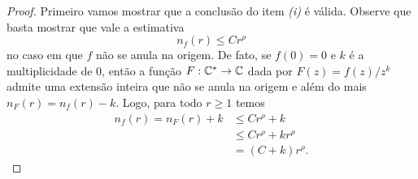     \begin{proof}
       Primeiro vamos mostrar que a conclusão do item {\it (i)} é válida. 
       Observe que basta mostrar que vale a estimativa
       \begin{equation*}
           n_f(r) \leq Cr^{\rho}
       \end{equation*}
       no caso em que $f$ não se anula na origem. 
       De fato, se $f(0) = 0$ e $k$
       é a multiplicidade de $0$, então a função $F:\mathbb{C}^*\to\mathbb{C}$ dada por 
       $F(z) = f(z)/z^k$ admite uma extensão inteira que não se anula na origem
       e além do mais $n_F(r) = n_f(r) - k$. Logo, para todo $r\geqslant 1$ temos
       \begin{align*}
           n_f(r) = n_F(r) + k &\leq Cr^{\rho} + k \\
                               &\leq Cr^{\rho} + kr^{\rho} \\
                               &= (C+k) r^{\rho}.
       \end{align*}


\end{proof}
